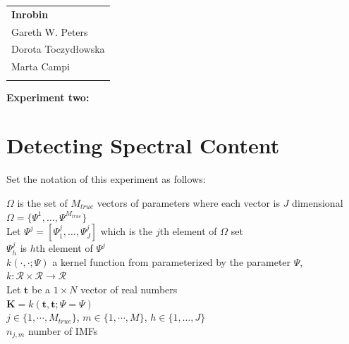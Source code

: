 \documentclass[11pt, a4paper]{article} %
\begin{document}
	
	
\setlength{\parindent}{0pt} %
\onehalfspacing				%


\begin{tabular}{p{15.5cm}}
	{\large \textbf{Inrobin}} \\
	Gareth W. Peters  \\ 
	Dorota Toczydłowska\\
	Marta Campi\\
	\hline
	\\
\end{tabular}

\vspace*{0.3cm}				%


\begin{center}
	{\LARGE \textbf{Experiment two:}}
	\vspace{2mm}	
\end{center} 

\section*{Detecting Spectral Content}
Set the notation of this experiment as follows:

$\Omega$ is the set of $M_{true}$ vectors of parameters where each vector is $J$ dimensional \\
$\Omega = \Big\{ \Psi^1, \ldots, \Psi^{M_{true}} \Big\}$\\
Let $\Psi^{j} = [\Psi^{j}_1, \ldots, \Psi^{j}_J]$ which is the $j$th element of $\Omega$ set\\
$\Psi^j_h$ is $h$th element of $\Psi^{j}$\\
$k(\cdot, \cdot;\Psi)$ a kernel function from parameterized by the parameter $\Psi$,  $k: \mathcal{R} \times \mathcal{R} \rightarrow \mathcal{R}$\\ 
Let $\mathbf{t}$ be a $1\times N$ vector of real numbers\\
$\mathbf{K} = k(\mathbf{t}, \mathbf{t};\Psi = \Psi)$\\
$j \in \Big\{ 1, \cdots, M_{true} \Big\}$, $m \in \Big\{ 1, \cdots, M \Big\}$, $h \in \Big\{1, \ldots, J \Big\}$\\ %
$n_{j,m}$ number of IMFs

\hfill
\end{document}
